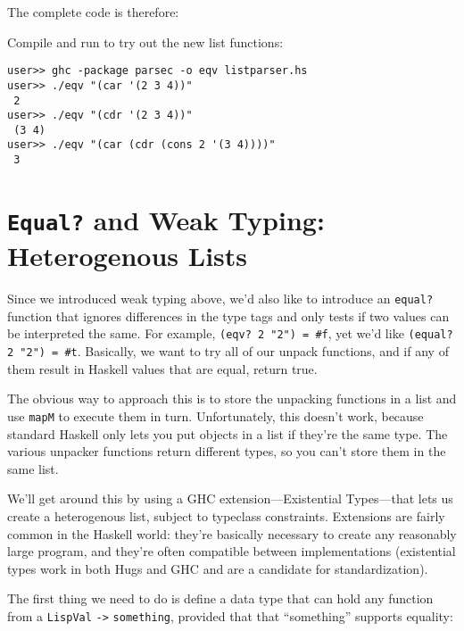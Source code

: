 The complete code is therefore:
 
 
Compile and run to try out the new list functions:
 
\begin{lstlisting}[language=shell,numbers=none,nolol]
user>> ghc -package parsec -o eqv listparser.hs
user>> ./eqv "(car '(2 3 4))"
 2
user>> ./eqv "(cdr '(2 3 4))"
 (3 4)
user>> ./eqv "(car (cdr (cons 2 '(3 4))))"
 3
\end{lstlisting}
 
\section{\texttt{Equal?} and Weak Typing: Heterogenous Lists}
 
Since we introduced weak typing above, we'd also like to introduce an \verb|equal?| function that ignores differences in the type tags and only tests if two values can be interpreted the same. For example, \lstinline|(eqv? 2 "2") = #f|, yet we'd like \lstinline|(equal? 2 "2") = #t|. Basically, we want to try all of our unpack functions, and if any of them result in Haskell values that are equal, return true.
 
The obvious way to approach this is to store the unpacking functions in a list and use \verb|mapM| to execute them in turn. Unfortunately, this doesn't work, because standard Haskell only lets you put objects in a list if they're the same type. The various unpacker functions return different types, so you can't store them in the same list.
 
We'll get around this by using a GHC extension---Existential Types---that lets us create a heterogenous list, subject to typeclass constraints. Extensions are fairly common in the Haskell world: they're basically necessary to create any reasonably large program, and they're often compatible between implementations (existential types work in both Hugs and GHC and are a candidate for standardization).
 
The first thing we need to do is define a data type that can hold any function from a \verb|LispVal| \lstinline|->| \verb|something|, provided that that ``something'' supports equality:
 
 
